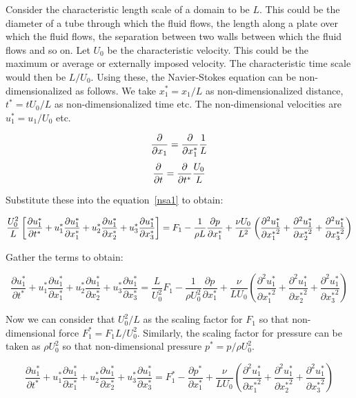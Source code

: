 Consider the characteristic length scale of a domain to be $L$. This could be the diameter of a tube through which the fluid flows, the length along a plate over which the fluid flows, the separation between two walls between which the fluid flows and so on. Let $U_0$ be the characteristic velocity. This could be the maximum or average or externally imposed velocity. The characteristic time scale would then be $L/U_0$. Using these, the Navier-Stokes equation can be non-dimensionalized as follows. We take $x_1^* = {x_1 / L}$ as non-dimensionalized distance, $t^* = {t U_0 / L}$ as non-dimensionalized time etc. The non-dimensional velocities are $u_1^* = {u_1/U_0}$ etc.

$$ {\partial \over \partial x_1} = {\partial \over \partial x_1^*} {1 \over L}$$ 
$$ {\partial \over \partial t} = {\partial \over \partial t^*} {U_0 \over L}$$ 

Substitute these into the equation~\ref{nsa1} to obtain:

\begin{equation}
{U_0^2 \over L} \left[  \frac{\partial u_1^*}{\partial t^*} + u_1^* \frac{\partial u_1^*}{\partial x_1^*} + u_2^* \frac{\partial u_1^*}{\partial x_2^*} + u_3^* \frac{\partial u_1^*}{\partial x_3^*} \right] = F_1 -  \frac{1}{\rho L} \frac{\partial p}{\partial x_1^*} + \frac{\nu U_0}{L^2} \left( \frac{\partial^2 u_1^*}{\partial {x_1^*}^2} + \frac{\partial^2 u_1^*}{\partial {x_2^*}^2} + \frac{\partial^2 u_1^*}{\partial {x_3^*}^2} \right)
\end{equation} 

Gather the terms to obtain:

\begin{equation}
\frac{\partial u_1^*}{\partial t^*} + u_1^* \frac{\partial u_1^*}{\partial x_1^*} + u_2^* \frac{\partial u_1^*}{\partial x_2^*} + u_3^* \frac{\partial u_1^*}{\partial x_3^*} = \frac{L}{U_0^2} F_1 -  \frac{1}{\rho U_0^2} \frac{\partial p}{\partial x_1^*} + \frac{\nu}{L U_0} \left( \frac{\partial^2 u_1^*}{\partial {x_1^*}^2} + \frac{\partial^2 u_1^*}{\partial {x_2^*}^2} + \frac{\partial^2 u_1^*}{\partial {x_3^*}^2} \right)
\end{equation} 

Now we can consider that $U_0^2 / L$ as the scaling factor for $F_1$ so that non-dimensional force $F_1^* = {F_1 L / U_0^2}$. Similarly, the scaling factor for pressure can be taken as $\rho U_0^2$ so that non-dimensional pressure $p^* = {p / {\rho U_0^2}}$.


\begin{equation}
\frac{\partial u_1^*}{\partial t^*} + u_1^* \frac{\partial u_1^*}{\partial x_1^*} + u_2^* \frac{\partial u_1^*}{\partial x_2^*} + u_3^* \frac{\partial u_1^*}{\partial x_3^*} = F_1^* -  \frac{\partial p^*}{\partial x_1^*} + \frac{\nu}{L U_0} \left( \frac{\partial^2 u_1^*}{\partial {x_1^*}^2} + \frac{\partial^2 u_1^*}{\partial {x_2^*}^2} + \frac{\partial^2 u_1^*}{\partial {x_3^*}^2} \right)
\end{equation} 


